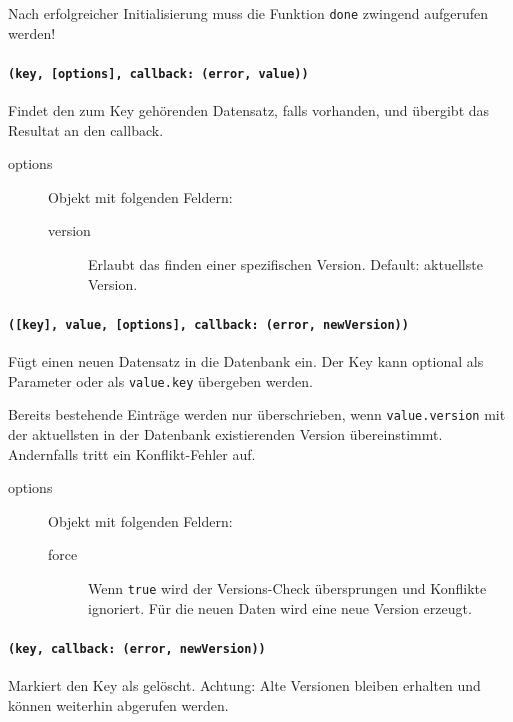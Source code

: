 Nach erfolgreicher Initialisierung muss die Funktion \texttt{done} zwingend aufgerufen werden!


\paragraph{\texttt{(key, [options], callback: (error, value))}}
Findet den zum Key gehörenden Datensatz, falls vorhanden, und übergibt das Resultat an den callback.
\begin{description}
\item[options] Objekt mit folgenden Feldern:
\begin{description}
\item[version] Erlaubt das finden einer spezifischen Version. Default: aktuellste Version.
\end{description}
\end{description}

\paragraph{\texttt{([key], value, [options], callback: (error, newVersion))}}
Fügt einen neuen Datensatz in die Datenbank ein. Der Key kann optional als Parameter oder als \texttt{value.key} übergeben werden.

Bereits bestehende Einträge werden nur überschrieben, wenn \texttt{value.version} mit der aktuellsten in der Datenbank existierenden Version übereinstimmt. Andernfalls tritt ein Konflikt-Fehler auf.

\begin{description}
\item[options] Objekt mit folgenden Feldern:
    \begin{description}
    \item[force] Wenn \texttt{true} wird der Versions-Check übersprungen und Konflikte ignoriert. Für die neuen Daten wird eine neue Version erzeugt.
    \end{description}
\end{description}


\paragraph{\texttt{(key, callback: (error, newVersion))}}
Markiert den Key als gelöscht. Achtung: Alte Versionen bleiben erhalten und können weiterhin abgerufen werden.

